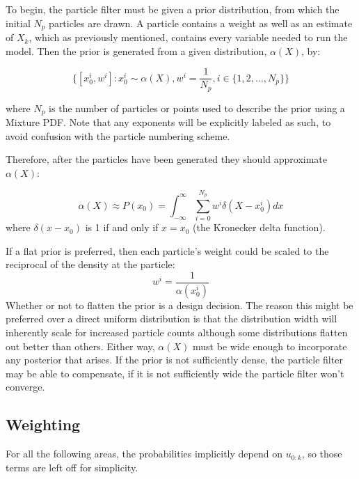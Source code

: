 To begin, the particle filter must be given a prior distribution, from
which the initial $N_p$ particles are drawn. A particle contains a weight
as well as an estimate of $X_k$, which as previously mentioned, contains every
variable needed to run the model. Then the prior is generated from a 
given distribution, $\alpha(X)$, by:

\begin{equation}
\{[x^i_0,w^i] : x^i_0 \sim \alpha(X), w^i = \frac{1}{N_p}, i \in \{1, 2, ... , N_p\} \}
\end{equation}

where $N_p$ is the number of particles or points used to describe the prior 
using a Mixture \ac{PDF}. 
Note that any exponents will be explicitly labeled as such, to avoid confusion with
the particle numbering scheme. 

Therefore, after the particles have been generated they should approximate $\alpha(X)$:

\begin{equation}
\alpha(X) \approx P(x_0) = \int_{-\infty}^{\infty}
    \sum_{i=0}^{N_p} w^i\delta(X - x^i_0 ) dx
\end{equation}
where $\delta(x-x_0)$ is 1 if and only if $x = x_0$ 
(the Kronecker delta function).

If a flat prior is 
preferred, then each particle's weight could be scaled to the reciprocal of the
density at the particle: 
\begin{equation}
w^i = \frac{1}{\alpha(x^i_0)}
\end{equation}
Whether or not to flatten the prior is a design decision. The reason this might 
be preferred over a direct
uniform distribution is that the distribution width will inherently scale 
for increased particle counts although some distributions
flatten out better than others. Either way, $\alpha(X)$ must be
wide enough to incorporate any posterior that arises. If the prior is
not sufficiently dense, the particle filter may be able to compensate, if it is
not sufficiently wide the particle filter won't converge. 

\subsection{Weighting}
For all the following areas, the probabilities implicitly depend on $u_{0:k}$, 
so those terms are left off for simplicity.

